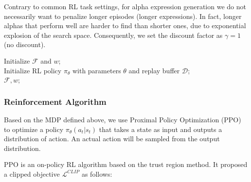 Contrary to common RL task settings, for alpha expression generation we do not necessarily want to penalize longer episodes (longer expressions). In fact, longer alphas that perform well are harder to find than shorter ones, due to exponential explosion of the search space. Consequently, 
we set the discount factor as $\gamma = 1$ (no discount).

\begin{algorithm}
\caption{Alpha Mining Pipeline}
\label{alg:rl}
Initialize $\mathcal{F}$ and $w$;\\
Initialize RL policy $\pi_{\theta}$ with parameters $\theta$ and replay buffer $\mathcal{D}$;\\
\Return $\mathcal{F}, w$;
\end{algorithm}

\subsubsection{Reinforcement Algorithm}

Based on the MDP defined above, we use Proximal Policy Optimization (PPO) \cite{ppo} to optimize a policy $\pi_\theta(a_t | s_t)$ that takes a state as input and outputs a distribution of action. An actual action will be sampled from the output distribution.

PPO is an on-policy RL algorithm based on the trust region method. It proposed a clipped objective $\mathcal{L}^{CLIP}$ as follows:

